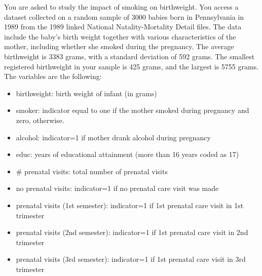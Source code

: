 \documentclass{article}
\begin{document}
You are asked to study the impact of smoking on birthweight. You access a dataset collected on a random sample of 3000 babies born in Pennsylvania in 1989 from the 1989 linked National Natality-Mortality Detail files. The data include the baby’s birth weight together with various characteristics of the mother, including whether she smoked during the pregnancy. The average birthweight is 3383 grams, with a standard deviation of 592 grams. The smallest registered birthweight in your sample is 425 grams, and the largest is 5755 grams.\\

The variables are the following:
\begin{itemize}
    \item[-] birthweight: birth weight of infant (in grams)
    \item[-] smoker: indicator equal to one if the mother smoked during pregnancy and zero, otherwise.
    \item[-] alcohol: indicator=1 if mother drank alcohol during pregnancy
    \item[-] educ: years of educational attainment (more than 16 years coded as 17)
    \item[-] \# prenatal visits: total number of prenatal visits
    \item[-] no prenatal visits: indicator=1 if no prenatal care visit was made
    \item[-] prenatal visits (1st semester): indicator=1 if 1st prenatal care visit in 1st trimester
    \item[-] prenatal visits (2nd semester): indicator=1 if 1st prenatal care visit in 2nd trimester
    \item[-] prenatal visits (3rd semester): indicator=1 if 1st prenatal care visit in 3rd trimester
\end{itemize}

\vspace{.5cm}
\end{document}

